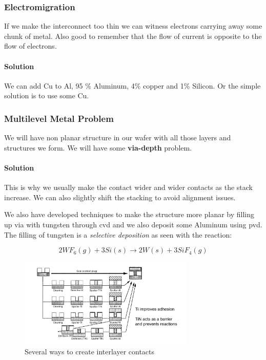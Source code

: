 \documentclass[
]{article}
\begin{document}
\hypertarget{electromigration}{%
\subsubsection{Electromigration}\label{electromigration}}

If we make the interconnect too thin we can witness electrons carrying
away some chunk of metal. Also good to remember that the flow of current
is opposite to the flow of electrons.

\hypertarget{solution-1}{%
\paragraph{Solution}\label{solution-1}}

We can add Cu to Al, 95 \% Aluminum, 4\% copper and 1\% Silicon. Or the
simple solution is to use some Cu.

\hypertarget{multilevel-metal-problem}{%
\subsubsection{Multilevel Metal
Problem}\label{multilevel-metal-problem}}

We will have non planar structure in our wafer with all those layers and
structures we form. We will have some \textbf{via-depth} problem.

\hypertarget{solution-2}{%
\paragraph{Solution}\label{solution-2}}

This is why we usually make the contact wider and wider contacts as the
stack increase. We can also slightly shift the stacking to avoid
alignment issues.

We also have developed techniques to make the structure more planar by
filling up via with tungsten through {cvd} and we also deposit some
Aluminum using {pvd}. The filling of tungsten is a \emph{selective
deposition} as seen with the reaction:

\[2 WF_6 (g) + 3 Si (s) \longrightarrow 2 W (s) + 3SiF_4 (g)\]

\begin{figure}
\hypertarget{fig:enter-label}{%
\centering
\includegraphics[width=0.75\textwidth,height=\textheight]{contact.png}
\caption{Several ways to create interlayer
contacts}\label{fig:enter-label}
}
\end{figure}
\end{document}
